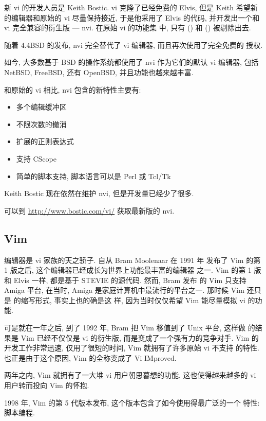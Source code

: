 新 vi 的开发人员是 Keith Bostic. vi 克隆了已经免费的 Elvis, 但是
Keith 希望新的编辑器和原始的 vi 尽量保持接近, 于是他采用了 Elvis 的代码,
并开发出一个和 vi 完全兼容的衍生版 --- nvi. 在原始  vi 的功能集
中, 只有  () 和 
() 被剔除出去.

随着 4.4BSD 的发布, nvi 完全替代了 vi 编辑器, 而且再次使用了完全免费的
授权.

如今, 大多数基于 BSD 的操作系统都使用了 nvi 作为它们的默认 vi 编辑器,
包括 NetBSD, FreeBSD, 还有 OpenBSD, 并且功能也越来越丰富.

和原始的 vi 相比, nvi 包含的新特性主要有:
\begin{itemize}
    \item 多个编辑缓冲区
    \item 不限次数的撤消
    \item 扩展的正则表达式
    \item 支持 CScope
    \item 简单的脚本支持, 脚本语言可以是 Perl 或 Tcl/Tk
\end{itemize}

Keith Bostic 现在依然在维护 nvi, 但是开发量已经少了很多.
\begin{warning}
    可以到 \url{http://www.bostic.com/vi/} 获取最新版的 nvi.
\end{warning}

\subsection{Vim}
\label{subsec:vim}
 编辑器是 vi 家族的天之骄子. 自从 Bram Moolenaar 在 1991 年
发布了 Vim 的第 1 版之后, 这个编辑器已经成长为世界上功能最丰富的编辑器
之一.
Vim 的第 1 版和 Elvis 一样, 都是基于 STEVIE 的源代码. 然而, Bram 发布
的 Vim 只支持 Amiga 平台, 在当时, Amiga 是家庭计算机中最流行的平台之一.
那时候 Vim 还只是  的缩写形式, 事实上也的确是这
样, 因为当时仅仅希望 Vim 能尽量模拟 vi 的功能.

可是就在一年之后, 到了 1992 年, Bram 把 Vim 移值到了 Unix 平台, 这样做
的结果是 Vim 已经不仅仅是 vi 的衍生版, 而是变成了一个强有力的竞争对手. Vim
的开发工作非常迅速, 仅用了很短的时间, Vim 就拥有了许多原始 vi 不支持
的特性. 也正是由于这个原因, Vim 的全称变成了 Vi IMproved.

两年之内, Vim 就拥有了一大堆 vi 用户朝思暮想的功能, 这也使得越来越多的
vi 用户转而投向 Vim 的怀抱.

1998 年, Vim 的第 5 代版本发布, 这个版本包含了如今使用得最广泛的一个
特性: 脚本编程.

